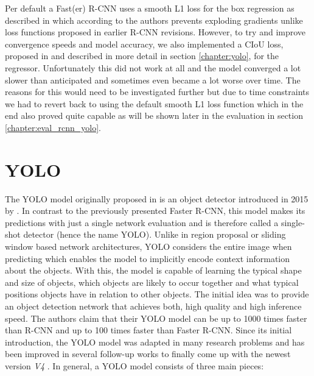 Per default a Fast(er) R-CNN uses a smooth L1 loss for the box regression as described in \autocite{girshick_fast_2015} which according to the authors prevents exploding gradients unlike loss functions proposed in earlier R-CNN revisions. However, to try and improve convergence speeds and model accuracy, we also implemented a \ac{CIoU} loss, proposed in \autocite{zheng_enhancing_2021} and described in more detail in section \vref{chapter:yolo}, for the regressor. Unfortunately this did not work at all and the model converged a lot slower than anticipated and sometimes even became a lot worse over time. The reasons for this would need to be investigated further but due to time constraints we had to revert back to using the default smooth L1 loss function which in the end also proved quite capable as will be shown later in the evaluation in section \vref{chapter:eval_rcnn_yolo}.

\section{YOLO}\label{chapter:yolo}

The \acf{YOLO} model originally proposed in \autocite{yoloOriginal} is an object detector introduced in 2015 by \citeauthor{yoloOriginal}. In contrast to the previously presented Faster \ac{R-CNN}, this model makes its predictions with just a single network evaluation and is therefore called a single-shot detector (hence the name \ac{YOLO}). Unlike in region proposal or sliding window based network architectures, \ac{YOLO} considers the entire image when predicting which enables the model to implicitly encode context information about the objects. With this, the model is capable of learning the typical shape and size of objects, which objects are likely to occur together and what typical positions objects have in relation to other objects. The initial idea was to provide an object detection network that achieves both, high quality and high inference speed. The authors claim that their \ac{YOLO} model can be up to 1000 times faster than \ac{R-CNN} and up to 100 times faster than Faster \ac{R-CNN}.
Since its initial introduction, the \ac{YOLO} model was adapted in many research problems and has been improved in several follow-up works \autocite{yolov2} \autocite{yolov3} to finally come up with the newest version \textit{V4} \autocite{yolov4}.
In general, a \ac{YOLO} model consists of three main pieces:

